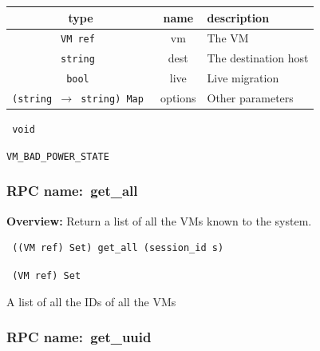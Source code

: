 
 
\vspace{0.3cm}
\begin{tabular}{|c|c|p{7cm}|}
 \hline
{\bf type} & {\bf name} & {\bf description} \\ \hline
{\tt VM ref } & vm & The VM \\ \hline 

{\tt string } & dest & The destination host \\ \hline 

{\tt bool } & live & Live migration \\ \hline 

{\tt (string $\rightarrow$ string) Map } & options & Other parameters \\ \hline 

\end{tabular}

\vspace{0.3cm}

{\tt 
void
}



\vspace{0.3cm}

 {\tt VM\_BAD\_POWER\_STATE}

\vspace{0.6cm}
\subsubsection{RPC name:~get\_all}

{\bf Overview:} 
Return a list of all the VMs known to the system.

\begin{verbatim} ((VM ref) Set) get_all (session_id s)\end{verbatim}


\vspace{0.3cm}

{\tt 
(VM ref) Set
}


A list of all the IDs of all the VMs
\vspace{0.3cm}
\vspace{0.3cm}
\vspace{0.3cm}
\subsubsection{RPC name:~get\_uuid}

